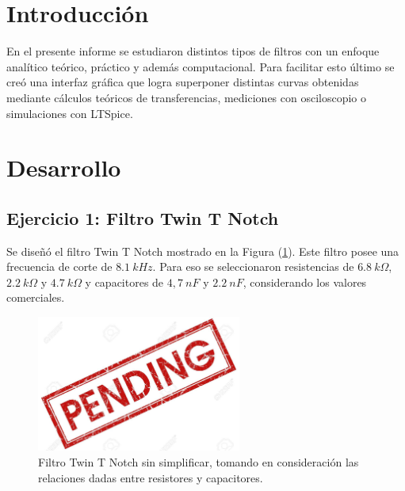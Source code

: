 \documentclass[a4paper]{article}
\begin{document}




\section{Introducción}

En el presente informe se estudiaron distintos tipos de filtros con un enfoque analítico teórico, práctico y además computacional. Para facilitar esto último se creó una interfaz gráfica que logra superponer distintas curvas obtenidas mediante cálculos teóricos de transferencias, mediciones con osciloscopio o simulaciones con LTSpice.

\section{Desarrollo}

\subsection{Ejercicio 1: Filtro Twin T Notch}

Se diseñó el filtro Twin T Notch mostrado en la Figura (\ref{fig:filtroinicial}). Este filtro posee una frecuencia de corte de $ 8.1 \ kHz $. Para eso se seleccionaron resistencias de $ 6.8 \ k\Omega $, $ 2.2 \ k\Omega $ y $ 4.7 \ k\Omega $ y capacitores de $ 4,7 \ nF $ y $ 2.2 \ nF $, considerando los valores comerciales.

\begin{figure}[H]
	\centering
	\includegraphics[width=0.6\textwidth]{pend.jpg}
\caption{Filtro Twin T Notch sin simplificar, tomando en consideración las relaciones dadas entre resistores y capacitores.}
	\label{fig:filtroinicial}
\end{figure}
\end{document}
